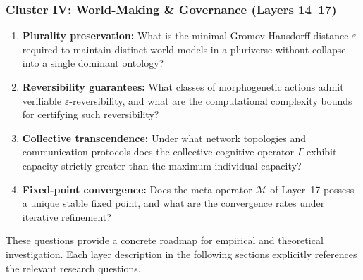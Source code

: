 \subsubsection{Cluster IV: World-Making \& Governance (Layers 14--17)}
\begin{enumerate}[label=RQ\arabic*:, leftmargin=2.5cm, resume=rq]
    \item \textbf{Plurality preservation:} What is the minimal Gromov-Hausdorff distance $\varepsilon$ required to maintain distinct world-models in a pluriverse without collapse into a single dominant ontology?
    \item \textbf{Reversibility guarantees:} What classes of morphogenetic actions admit verifiable $\varepsilon$-reversibility, and what are the computational complexity bounds for certifying such reversibility?
    \item \textbf{Collective transcendence:} Under what network topologies and communication protocols does the collective cognitive operator $\Gamma$ exhibit capacity strictly greater than the maximum individual capacity?
    \item \textbf{Fixed-point convergence:} Does the meta-operator $\mathcal{M}$ of Layer~17 possess a unique stable fixed point, and what are the convergence rates under iterative refinement?
\end{enumerate}

These questions provide a concrete roadmap for empirical and theoretical investigation. Each layer description in the following sections explicitly references the relevant research questions.